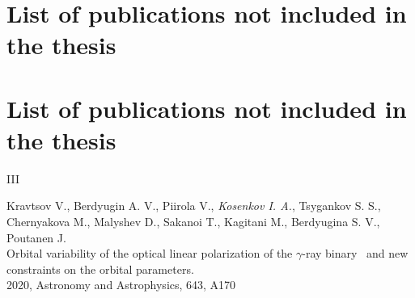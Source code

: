 \iffin
\section*{List of publications not included in the thesis}
\else
\section*{List of publications not included in the thesis}
\fi
\begin{entry}{III}
    \item[] Kravtsov V., Berdyugin A. V., Piirola V., \textit{Kosenkov I. A.}, Tsygankov S. S., Chernyakova M., Malyshev D., Sakanoi T., Kagitani M., Berdyugina S. V., Poutanen J.\\ Orbital variability of the optical linear polarization of the $\gamma$-ray binary \LSI\ and new constraints on the orbital parameters.\\ 2020, Astronomy and Astrophysics, 643, A170
\end{entry}


